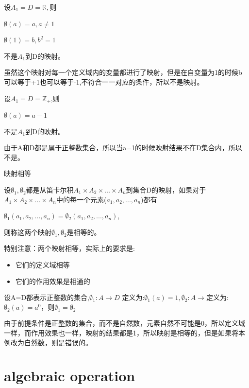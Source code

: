 \documentclass[
	11pt, %
	fleqn, %
	a4paper, %
]{LegrandOrangeBook}
\begin{document}
\begin{example}
	设$A_1=D=\mathbb{R},则$

	$\emptyset(a)=a,a\not =1$\par
	$\emptyset(1)=b,b^2=1$\par
	不是$A_1$到D的映射。\par
	虽然这个映射对每一个定义域内的变量都进行了映射，但是在自变量为1的时候b可以等于+1也可以等于-1,不符合一一对应的条件，所以不是映射。
\end{example}

\begin{example}
	设$A_1=D=\mathbb{Z}_+$,则\par
	$\emptyset(a)=a-1$\par
	不是$A_1$到D的映射。\par
	由于A和D都是属于正整数集合，所以当a=1的时候映射结果不在D集合内，所以不是。
\end{example}

\begin{theorem}{映射相等}

	设$\emptyset_1,\emptyset_2$都是从笛卡尔积$A_1\times A_2 \times ...\times A_n$到集合D的映射，如果对于$A_1\times A_2 \times ...\times A_n$中的每一个元素($a_1,a_2,...,a_n$)都有
	\begin{center}
		$\emptyset_1(a_1,a_2,...,a_n)=\emptyset_2(a_1,a_2,...,a_n)$,
	\end{center}\par
	则称这两个映射$\emptyset_1,\emptyset_2$是相等的。
\end{theorem}
\begin{remark}
	特别注意：两个映射相等，实际上的要求是:
	\begin{itemize}
		\item 它们的定义域相等
		\item 它们的作用效果是相通的
	\end{itemize}
\end{remark}

\begin{example}
	设A=D都表示正整数的集合,$\emptyset_1: A\rightarrow D$ 定义为:$\emptyset_1(a)=1,\emptyset_2: A\rightarrow $定义为:$\emptyset_2(a)=a^0$，则$\emptyset_1=\emptyset_2$

	由于前提条件是正整数的集合，而不是自然数，元素自然不可能是0，所以定义域一样，而作用效果也一样，映射的结果都是1，所以映射是相等的，但是如果将本例改为自然数，则是错误的。
\end{example}
\section{algebraic operation}
\end{document}
